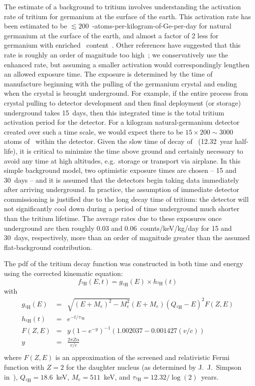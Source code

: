 The estimate of a background to tritium involves understanding the activation rate of tritium for germanium at the surface of the earth.  This activation rate has been estimated to be $\lesssim200$~\hthree-atoms-per-kilogram-of-Ge-per-day for natural germanium at the surface of the earth, and almost a factor of 2 less for germanium with enriched \gersevensix~content~\cite{Avi92}.  Other references have suggested that this rate is roughly an order of magnitude too high~\cite{Col92,Mei2009417}; we conservatively use the enhanced rate, but assuming a smaller activation would correspondingly lengthen an allowed exposure time.  The exposure is determined by the time of manufacture beginning with the pulling of the germanium crystal and ending when the crystal is brought underground.  For example, if the entire process from crystal pulling to detector development and then final deployment (or storage) underground takes 15~days, then this integrated time is the total tritium activation period for the detector.  For a kilogram natural-germanium detector created over such a time scale, we would expect there to be $15\times200\sim3000$ atoms of \hthree~within the detector.  Given the slow time of decay of \hthree~(12.32~year half-life), it is critical to minimize the time above ground and certainly necessary to avoid any time at high altitudes, e.g.~storage or transport via airplane.  In this simple background model, two optimistic exposure times are chosen -- 15 and 30~days -- and it is assumed that the detectors begin taking data immediately after arriving underground.  In practice, the assumption of immediate detector commissioning is justified due to the long decay time of tritium: the detector will not significantly cool down during a period of time underground much shorter than the tritium lifetime.  The average rates due to these exposures once underground are then roughly 0.03 and 0.06~counts/keV/kg/day for 15 and 30~days, respectively, more than an order of magnitude greater than the assumed flat-background contribution.  

The pdf of the tritium decay function was constructed in both time and energy using the corrected kinematic equation:
		\begin{equation}
			f_{^{3}\text{H}}\left(E, t\right)  =  g_{^{3}\text{H}}\left(E\right) \times h_{^{3}\text{H}}\left(t\right) 
		\end{equation}
		with
		\begin{eqnarray*}
		g_{^{3}\text{H}}\left(E\right) & = & \sqrt{(E + M_e)^2 - M_e^2} \left(
			E + M_e \right) \left( Q_{^3\text{H}} - E \right)^2 F(Z, E) \\
h_{^{3}\text{H}}\left(t\right) & = & e^{-t/\tau_{^3\text{H}}} \\
		F(Z,E) & =  & y ( 1 - e^{-y} )^{-1} (1.002037 - 0.001427(v/c)) \\
		y & = & \frac{2 \pi Z \alpha}{v/c} \\
		\end{eqnarray*}
		where $F(Z,E)$ is an approximation of the screened and relativistic
Fermi function with $Z = 2$ for the daughter nucleus (as determined by
J.~J.~Simpson in~\cite{Simp81}), $Q_{^3\text{H}}=18.6$~keV, $M_{e}=511$~keV,
and $\tau_{^3\text{H}} = 12.32 / \log(2)$~years.  
		
